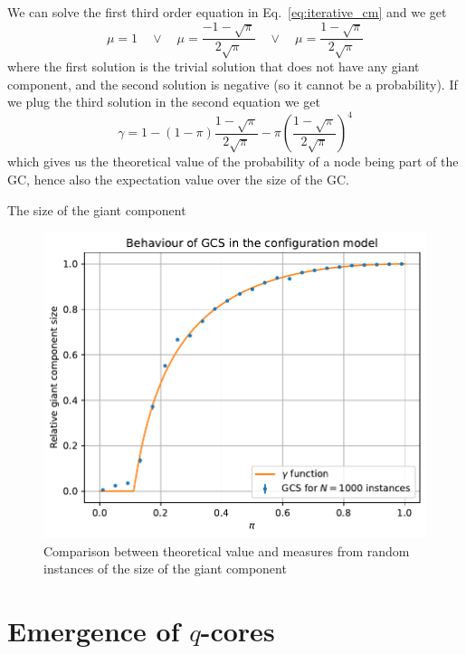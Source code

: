 \documentclass[handout]{beamer}
\begin{document}
\begin{frame}{}
    We can solve the first third order equation in Eq.~\ref{eq:iterative_cm} and
    we get
    $$
    \mu = 1 \quad \lor \quad \mu = \frac{-1-\sqrt{\pi}}{2\sqrt{\pi}} \quad
    \lor \quad \mu = \frac{1-\sqrt{\pi}}{2\sqrt{\pi}}
    $$
    where the first solution is the trivial solution that does not have any
    giant component, and the second solution is negative (so it cannot be a
    probability). If we plug the third solution in the second equation we get
    \begin{equation}
        \gamma = 1 - (1-\pi) \frac{1-\sqrt{\pi}}{2\sqrt{\pi}} - \pi \left(
        \frac{1-\sqrt{\pi}}{2\sqrt{\pi}} \right)^4
        \label{eq:gamma_final}
    \end{equation}
    which gives us the theoretical value of the probability of a node being part
    of the GC, hence also the expectation value over the size of the GC.
\end{frame}

\begin{frame}{The size of the giant component}
    \begin{figure}
        \centering
        \includegraphics[height=.7\textheight]{gcs}
        \caption{Comparison between theoretical value and measures from random
        instances of the size of the giant component}
        \label{fig:gcs}
    \end{figure}
\end{frame}

\section{Emergence of $q$-cores}
\end{document}
